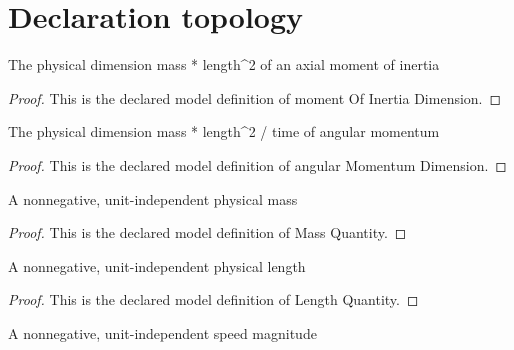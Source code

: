 \section{Declaration topology}
\begin{definition}
  \label{def:physics:phyx-mini-0827:phyxminiproblems-problemphyxmini0827-momentofinertiadimension}
  The physical dimension mass * length\textasciicircum{}2 of an axial moment of inertia
\end{definition}
\begin{proof}
  This is the declared model definition of moment Of Inertia Dimension.
\end{proof}
\begin{definition}
  \label{def:physics:phyx-mini-0827:phyxminiproblems-problemphyxmini0827-angularmomentumdimension}
  The physical dimension mass * length\textasciicircum{}2 / time of angular momentum
\end{definition}
\begin{proof}
  This is the declared model definition of angular Momentum Dimension.
\end{proof}
\begin{definition}
  \label{def:physics:phyx-mini-0827:phyxminiproblems-problemphyxmini0827-massquantity}
  A nonnegative, unit-independent physical mass
\end{definition}
\begin{proof}
  This is the declared model definition of Mass Quantity.
\end{proof}
\begin{definition}
  \label{def:physics:phyx-mini-0827:phyxminiproblems-problemphyxmini0827-lengthquantity}
  A nonnegative, unit-independent physical length
\end{definition}
\begin{proof}
  This is the declared model definition of Length Quantity.
\end{proof}
\begin{definition}
  \label{def:physics:phyx-mini-0827:phyxminiproblems-problemphyxmini0827-speedquantity}
  A nonnegative, unit-independent speed magnitude
\end{definition}
